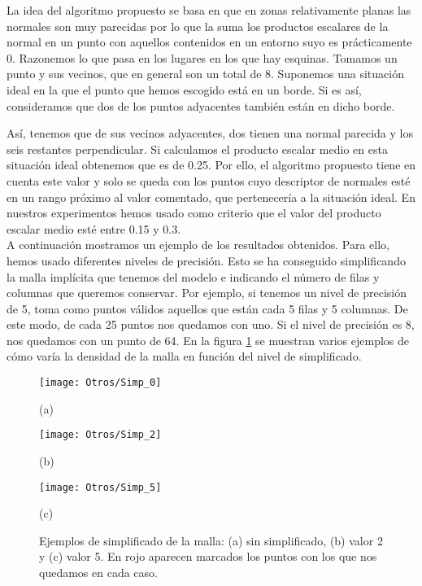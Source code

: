 La idea del algoritmo propuesto se basa en que en zonas relativamente planas las normales son muy parecidas por lo que la suma los productos escalares de la normal en un punto con aquellos contenidos en un entorno suyo es prácticamente 0. Razonemos lo que pasa en los lugares en los que hay esquinas. Tomamos un punto y sus vecinos, que en general son un total de 8. Suponemos una situación ideal en la que el punto que hemos escogido está en un borde. Si es así, consideramos que dos de los puntos adyacentes también están en dicho borde. \begin{comment}
INCLUIR DIBUJO !!!!!!!!!!!!!!!11
\end{comment} 
Así, tenemos que de sus vecinos adyacentes, dos tienen una normal parecida y los seis restantes perpendicular. Si calculamos el producto escalar medio en esta situación ideal obtenemos que es de 0.25. Por ello, el algoritmo propuesto tiene en cuenta este valor y solo se queda con los puntos cuyo descriptor de normales esté en un rango próximo al valor comentado, que pertenecería a la situación ideal. En nuestros experimentos hemos usado como criterio que el valor del producto escalar medio esté entre 0.15 y 0.3. \\

A continuación mostramos un ejemplo de los resultados obtenidos. Para ello, hemos usado diferentes niveles de precisión. Esto se ha conseguido simplificando la malla implícita que tenemos del modelo e indicando el número de filas y columnas que queremos conservar. Por ejemplo, si tenemos un nivel de precisión de 5, toma como puntos válidos aquellos que están cada 5 filas y 5 columnas. De este modo, de cada 25 puntos nos quedamos con uno. Si el nivel de precisión es 8, nos quedamos con un punto de 64. En la figura \ref{Ej_simpli} se muestran varios ejemplos de cómo varía la densidad de la malla en función del nivel de simplificado.
\begin{figure}[h!]
	\centering
	\begin{minipage}[b]{0.45\textwidth}
		\centering
		\texttt{[image: Otros/Simp\_0]}
		\caption*{(a)}
	\end{minipage}
	\begin{minipage}[b]{0.45\textwidth}
		\centering
		\texttt{[image: Otros/Simp\_2]}
		\caption*{(b)}
	\end{minipage}
	\begin{minipage}[b]{0.45\textwidth}
		\centering
		\texttt{[image: Otros/Simp\_5]}
		\caption*{(c)}
	\end{minipage}
	\caption{Ejemplos de simplificado de la malla: (a) sin simplificado, (b) valor 2 y (c) valor 5. En rojo aparecen marcados los puntos con los que nos quedamos en cada caso.}
	\label{Ej_simpli}
\end{figure}

